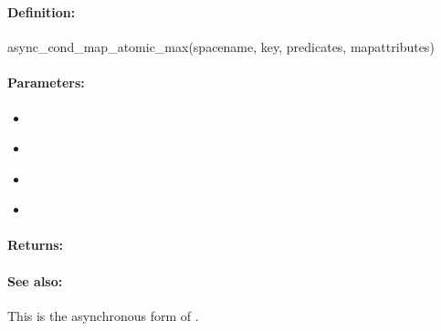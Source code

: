 \pagebreak
\subsubsection{}
\label{api:ruby:async_cond_map_atomic_max}


\paragraph{Definition:}
\begin{rubycode}
async_cond_map_atomic_max(spacename, key, predicates, mapattributes)
\end{rubycode}

\paragraph{Parameters:}
\begin{itemize}[noitemsep]
\item {}\\

\item {}\\

\item {}\\

\item {}\\

\end{itemize}

\paragraph{Returns:}


\paragraph{See also:}  This is the asynchronous form of .

\pagebreak
\subsubsection{}
\label{api:ruby:group_map_atomic_max}


